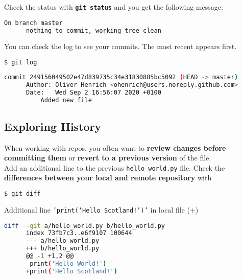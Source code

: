 \begin{frame}[fragile]
\emptyframetitle

  Check the status with \texttt{\textbf{git status}} and you get the following message:

  \begin{block}{}
    \begin{lstlisting}[language=bash]
      On branch master
      nothing to commit, working tree clean
    \end{lstlisting}
  \end{block}

  You can check the log to see your commits. The most recent appears first.

    \begin{lstlisting}[language=bash]
      $ git log
    \end{lstlisting}

  \begin{block}{}
    \begin{lstlisting}[language=bash]
      commit 249156049502e47d839735c34e31830885bc5092 (HEAD -> master)
      Author: Oliver Henrich <ohenrich@users.noreply.github.com>
      Date:   Wed Sep 2 16:56:07 2020 +0100
          Added new file
      \end{lstlisting}
  \end{block}
 
\end{frame}

\subsection{Exploring History}\hypertarget{sec1.5}{}

\begin{frame}[fragile]
\emptyframetitle

  When working with repos, you often want to \textbf{review changes before committing them} or \textbf{revert to a previous version} of the file.\\[0.25cm]

  Add an additional line to the previous \texttt{hello\_world.py} file. Check the \textbf{differences between your local and remote repository} with

  \begin{lstlisting}[language=bash]
    $ git diff
  \end{lstlisting}

  \begin{block}{Additional line \texttt{'print(`Hello Scotland!')'} in local file (+)}
    \begin{lstlisting}[language=bash]
      diff --git a/hello_world.py b/hello_world.py
      index 73fb7c3..e6f9107 100644
      --- a/hello_world.py
      +++ b/hello_world.py
      @@ -1 +1,2 @@
       print('Hello World!')
      +print('Hello Scotland!')
    \end{lstlisting}
  \end{block}

\end{frame}

